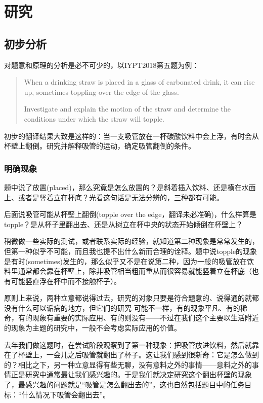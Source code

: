 \documentclass[a4paper,10pt,english]{sphinxmanual}
\begin{document}
\chapter{研究}
\label{\detokenize{5. Research::doc}}\label{\detokenize{5. Research:id1}}

\section{初步分析}
\label{\detokenize{5. Research:id2}}
对题意和原理的分析是必不可少的，以IYPT2018第五题为例：
\begin{quote}

When a drinking straw is placed in a glass of carbonated drink, it can rise up, sometimes toppling over the edge of the glass.

Investigate and explain the motion of the straw and determine the conditions under which the straw will topple.
\end{quote}

初步的翻译结果大致是这样的：当一支吸管放在一杯碳酸饮料中会上浮，有时会从杯壁上翻倒。研究并解释吸管的运动，确定吸管翻倒的条件。


\subsection{明确现象}
\label{\detokenize{5. Research:id3}}
题中说了放置(placed)，那么究竟是怎么放置的？是斜着插入饮料、还是横在水面上、或者是竖着立在杯底？光看这句话是无法分辨的，三种都有可能。

后面说吸管可能从杯壁上翻倒(topple over the edge，翻译未必准确)，什么样算是topple？是从杯子里翻出去、还是从树立在杯中央的状态开始倾倒在杯壁上？

稍微做一些实际的测试，或者联系实际的经验，就知道第二种现象是常常发生的，但第一种似乎不可能，而且我也提不出什么新而合理的诠释。题中说topple的现象是有时(sometimes)发生的，那么似乎又不是在说第二种，因为一般的吸管放在饮料里通常都会靠在杯壁上，除非吸管相当粗而重从而很容易就能竖着立在杯底（也有可能竖直浮在杯中而不接触杯子）。

原则上来说，两种立意都说得过去，研究的对象只要是符合题意的、说得通的就都没有什么可以诟病的地方，但它们的研究  可能不一样，有的现象平凡、有的稀奇，有的现象有重要的实际应用、有的则没有——不过在我们这个主要以生活附近的现象为主题的研究中，一般不会考虑实际应用的价值。

去年我们做这题时，在尝试阶段观察到了第一种现象：把吸管放进饮料，然后就靠在了杯壁上，一会儿之后吸管就翻出了杯子。这让我们感到很新奇：它是怎么做到的？相比之下，另一种立意显得有些无聊，没有意料之外的事情——意料之外的事情正是研究中通常最让我们感兴趣的。于是我们就决定研究这个翻出杯壁的现象了，最感兴趣的问题就是“吸管是怎么翻出去的”，这也自然包括题目中的任务目标：“什么情况下吸管会翻出去”。
\end{document}

